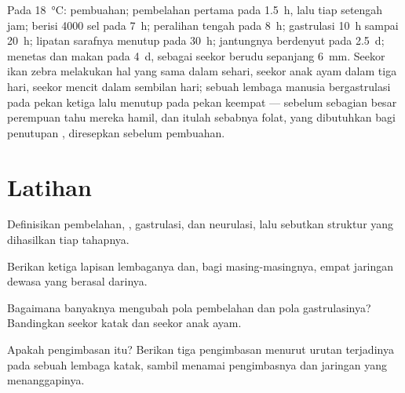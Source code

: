 \begin{example}\label{ex:b2:vertebrate-development:timetable}
Pada \qty{18}{\celsius}: pembuahan; pembelahan pertama pada
\qty{1.5}{h}, lalu tiap setengah jam;  berisi \num{4000} sel
pada \qty{7}{h}; peralihan  tengah pada \qty{8}{h}; gastrulasi
\qty{10}{h} sampai \qty{20}{h}; lipatan sarafnya menutup pada
\qty{30}{h}; jantungnya berdenyut pada \qty{2.5}{d}; menetas dan makan
pada \qty{4}{d}, sebagai seekor berudu sepanjang \qty{6}{mm}. Seekor
ikan zebra melakukan hal yang sama dalam sehari, seekor anak ayam dalam
tiga hari, seekor mencit dalam sembilan hari; sebuah lembaga manusia
bergastrulasi pada pekan ketiga lalu menutup  pada pekan
keempat --- sebelum sebagian besar perempuan tahu mereka hamil, dan
itulah sebabnya folat, yang dibutuhkan bagi penutupan ,
diresepkan sebelum pembuahan.
\end{example}

\section{Latihan}

\begin{exercise}[$\star$]\label{exo:b2:vertebrate-development:1}
Definisikan pembelahan, , gastrulasi, dan neurulasi, lalu
sebutkan struktur yang dihasilkan tiap tahapnya.
\end{exercise}

\begin{exercise}[$\star$]\label{exo:b2:vertebrate-development:2}
Berikan ketiga lapisan lembaganya dan, bagi masing-masingnya, empat
jaringan dewasa yang berasal darinya.
\end{exercise}

\begin{exercise}[$\star$]\label{exo:b2:vertebrate-development:3}
Bagaimana banyaknya  mengubah pola pembelahan dan pola
gastrulasinya? Bandingkan seekor katak dan seekor anak ayam.
\end{exercise}

\begin{exercise}[$\star$]\label{exo:b2:vertebrate-development:4}
Apakah pengimbasan itu? Berikan tiga pengimbasan menurut urutan
terjadinya pada sebuah lembaga katak, sambil menamai pengimbasnya dan
jaringan yang menanggapinya.
\end{exercise}

